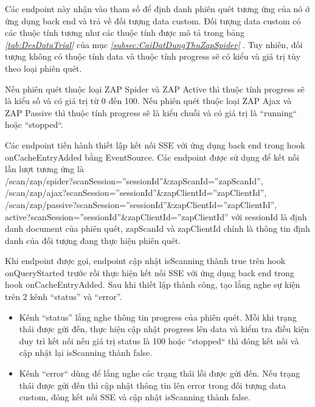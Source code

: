 Các endpoint này nhận vào tham số để định danh phiên quét tương ứng của nó ở ứng dụng back end và trả về đối tượng data custom.
Đối tượng data custom có các thuộc tính tương như các thuộc tính được mô tả trong bảng \textit{\ref{tab:DesDataTrial} } của mục \textit{\ref{subsec:CaiDatDungThuZapSpider} }.
Tuy nhiên, đối tượng không có thuộc tính data và thuộc tính progress sẽ có kiểu và giá trị tùy theo loại phiên quét.

Nếu phiên quét thuộc loại ZAP Spider và ZAP Active thì thuộc tính progress sẽ là kiểu số và có giá trị từ 0 đến 100.
Nếu phiên quét thuộc loại ZAP Ajax và ZAP Passive thì thuộc tính progress sẽ là kiểu chuỗi và có giá trị là “running“ hoặc “stopped“.

Các endpoint tiến hành thiết lập kết nối SSE với ứng dụng back end trong hook onCacheEntryAdded bằng EventSource. Các endpoint được sử dụng để kết nối lần lượt tương ứng là \\
/scan/zap/spider?scanSession=”sessionId”\&zapScanId=”zapScanId”, \\
/scan/zap/ajax?scanSession=”sessionId”\&zapClientId=”zapClientId”, \\
/scan/zap/passive?scanSession=”sessionId”\&zapClientId=”zapClientId”, \\
active?scanSession=”sessionId”\&zapClientId=”zapClientId” với sessionId là định danh document của phiên quét, zapScanId và zapClientId chính là thông tin định danh của đối tượng đang thực hiện phiên quét.

Khi endpoint được gọi, endpoint cập nhật isScanning thành true trên hook onQueryStarted trước rồi thực hiện kết nối SSE với ứng dụng back end trong hook onCacheEntryAdded.
Sau khi thiết lập thành công, tạo lắng nghe sự kiện trên 2 kênh “status” và “error”.
\begin{itemize}
  \item Kênh “status” lắng nghe thông tin progress của phiên quét.
        Mỗi khi trạng thái được gửi đến, thực hiện cập nhật progress lên data và kiểm tra điều kiện duy trì kết nối nếu giá trị status là 100 hoặc “stopped“ thì đóng kết nối và cập nhật lại isScanning thành false.
  \item Kênh “error“ dùng để lắng nghe các trạng thái lỗi được gửi đến.
        Nếu trạng thái được gửi đến thì cập nhật thông tin lên error trong đối tượng data custom, đóng kết nối SSE và cập nhật isScanning thành false.
\end{itemize}

